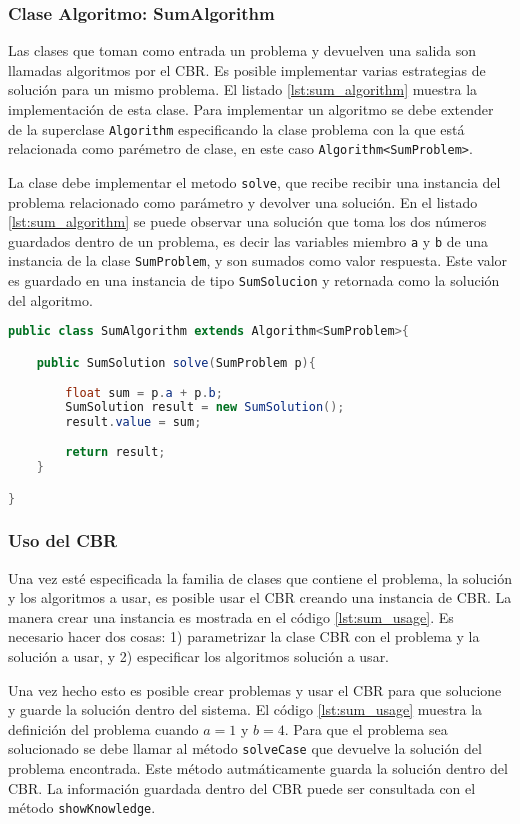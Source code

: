 \documentclass[11pt]{article}
\begin{document}
\subsubsection{Clase Algoritmo: SumAlgorithm}

Las clases que toman como entrada un problema y devuelven una salida son llamadas algoritmos por el CBR. Es posible implementar varias estrategias de solución para un mismo problema. El listado \ref{lst:sum_algorithm} muestra la implementación de esta clase. Para implementar un algoritmo se debe extender de la superclase \texttt{Algorithm} especificando la clase problema con la que está relacionada como parémetro de clase, en este caso \texttt{Algorithm<SumProblem>}. 

La clase debe implementar el metodo \texttt{solve}, que recibe recibir una instancia del problema relacionado como parámetro y devolver una solución. En el listado \ref{lst:sum_algorithm} se puede observar una solución que toma los dos números guardados dentro de un problema, es decir las variables miembro \texttt{a} y \texttt{b} de una instancia de la clase \texttt{SumProblem}, y son sumados como valor respuesta. Este valor es guardado en una instancia de tipo \texttt{SumSolucion} y retornada como la solución del algoritmo.

\begin{lstlisting}[language=Java, caption=Clase SumAlgorithm, label={lst:sum_algorithm}]
public class SumAlgorithm extends Algorithm<SumProblem>{

	public SumSolution solve(SumProblem p){
		
		float sum = p.a + p.b;
		SumSolution result = new SumSolution();
		result.value = sum;
		
		return result;
	}

}
\end{lstlisting}

\subsubsection{Uso del CBR}

Una vez esté especificada la familia de clases que contiene el problema, la solución y los algoritmos a usar, es posible usar el CBR creando una instancia de CBR. La manera crear una instancia es mostrada en el código \ref{lst:sum_usage}. Es necesario hacer dos cosas: 1) parametrizar la clase CBR con el problema y la solución a usar, y 2) especificar los algoritmos solución a usar. 

Una vez hecho esto es posible crear problemas y usar el CBR para que solucione y guarde la solución dentro del sistema. El código \ref{lst:sum_usage} muestra la definición del problema cuando $a=1$ y $b=4$. Para que el problema sea solucionado se debe llamar al método \texttt{solveCase} que devuelve la solución del problema encontrada. Este método autmáticamente guarda la solución dentro del CBR. La información guardada dentro del CBR puede ser consultada con el método \texttt{showKnowledge}.
\end{document}
